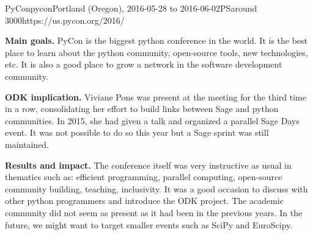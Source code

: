 \begin{event}{PyCon}{pycon}{Portland (Oregon), 2016-05-28 to 2016-06-02}{PS}{around 3000}{https://us.pycon.org/2016/}

\textbf{Main goals.} PyCon is the biggest python conference in the world. It is the best place to learn
about the python community, open-source tools, new technologies, etc. It is also a good place
to grow a network in the software development community.

\textbf{ODK implication.} Viviane Pons was present at the meeting for the third time in a row,
consolidating her effort to build links between Sage and python communities. In 2015, she had given
a talk and organized a parallel Sage Days event. It was not possible to do so this year but a
Sage sprint was still maintained.

\textbf{Results and impact.} The conference itself was very instructive as usual in thematics such as:
efficient programming, parallel computing, open-source community building, teaching, inclusivity. It
was a good occasion to discuss with other python programmers and introduce the ODK project. The academic
community did not seem as present as it had been in the previous years. In the future, we might want to
target smaller events such as SciPy and EuroScipy.
\end{event}